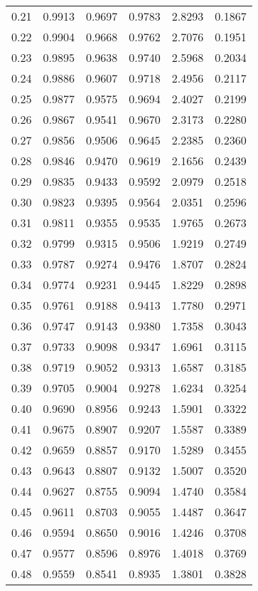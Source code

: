 \documentclass{article}
\begin{document}
\begin{longtable}{cccccc}
0.21 & 0.9913 & 0.9697 & 0.9783 & 2.8293 & 0.1867 \\
0.22 & 0.9904 & 0.9668 & 0.9762 & 2.7076 & 0.1951 \\
0.23 & 0.9895 & 0.9638 & 0.9740 & 2.5968 & 0.2034 \\
0.24 & 0.9886 & 0.9607 & 0.9718 & 2.4956 & 0.2117 \\
0.25 & 0.9877 & 0.9575 & 0.9694 & 2.4027 & 0.2199 \\
0.26 & 0.9867 & 0.9541 & 0.9670 & 2.3173 & 0.2280 \\
0.27 & 0.9856 & 0.9506 & 0.9645 & 2.2385 & 0.2360 \\
0.28 & 0.9846 & 0.9470 & 0.9619 & 2.1656 & 0.2439 \\
0.29 & 0.9835 & 0.9433 & 0.9592 & 2.0979 & 0.2518 \\
0.30 & 0.9823 & 0.9395 & 0.9564 & 2.0351 & 0.2596 \\
0.31 & 0.9811 & 0.9355 & 0.9535 & 1.9765 & 0.2673 \\
0.32 & 0.9799 & 0.9315 & 0.9506 & 1.9219 & 0.2749 \\
0.33 & 0.9787 & 0.9274 & 0.9476 & 1.8707 & 0.2824 \\
0.34 & 0.9774 & 0.9231 & 0.9445 & 1.8229 & 0.2898 \\
0.35 & 0.9761 & 0.9188 & 0.9413 & 1.7780 & 0.2971 \\
0.36 & 0.9747 & 0.9143 & 0.9380 & 1.7358 & 0.3043 \\
0.37 & 0.9733 & 0.9098 & 0.9347 & 1.6961 & 0.3115 \\
0.38 & 0.9719 & 0.9052 & 0.9313 & 1.6587 & 0.3185 \\
0.39 & 0.9705 & 0.9004 & 0.9278 & 1.6234 & 0.3254 \\
0.40 & 0.9690 & 0.8956 & 0.9243 & 1.5901 & 0.3322 \\
0.41 & 0.9675 & 0.8907 & 0.9207 & 1.5587 & 0.3389 \\
0.42 & 0.9659 & 0.8857 & 0.9170 & 1.5289 & 0.3455 \\
0.43 & 0.9643 & 0.8807 & 0.9132 & 1.5007 & 0.3520 \\
0.44 & 0.9627 & 0.8755 & 0.9094 & 1.4740 & 0.3584 \\
0.45 & 0.9611 & 0.8703 & 0.9055 & 1.4487 & 0.3647 \\
0.46 & 0.9594 & 0.8650 & 0.9016 & 1.4246 & 0.3708 \\
0.47 & 0.9577 & 0.8596 & 0.8976 & 1.4018 & 0.3769 \\
0.48 & 0.9559 & 0.8541 & 0.8935 & 1.3801 & 0.3828 \\

\end{longtable}
\end{document}
